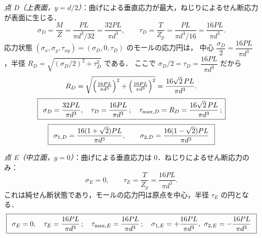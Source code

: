 \documentclass[11pt,a4paper]{article}
\begin{document}
\noindent\textit{点 D（上表面，$y=d/2$）}：曲げによる垂直応力が最大，ねじりによるせん断応力が表面に生じる．
\[
  \sigma_D=\frac{M}{Z}=\frac{PL}{\pi d^3/32}=\frac{32PL}{\pi d^3},\qquad
  \tau_D=\frac{T}{Z_p}=\frac{PL}{\pi d^3/16}=\frac{16PL}{\pi d^3}.
\]
応力状態 $(\sigma_x,\sigma_y,\tau_{xy})=(\sigma_D,0,\tau_D)$ のモールの応力円は，
中心 $\dfrac{\sigma_D}{2}=\dfrac{16PL}{\pi d^3}$，半径 $R_D=\sqrt{(\sigma_D/2)^2+\tau_D^2}$ である．
ここで $\sigma_D/2=\tau_D=\dfrac{16PL}{\pi d^3}$ だから
\[
  R_D=\sqrt{\Bigl(\tfrac{16PL}{\pi d^3}\Bigr)^2+\Bigl(\tfrac{16PL}{\pi d^3}\Bigr)^2}
     =\frac{16\sqrt{2}\,PL}{\pi d^3}.
\]
\[
  \boxed{\,\;\sigma_D=\dfrac{32PL}{\pi d^3},\quad \tau_D=\dfrac{16PL}{\pi d^3}\,;\quad
        \tau_{\max,D}=R_D=\dfrac{16\sqrt2\,PL}{\pi d^3}\,;\,}
\]
\[
  \boxed{\,\;\sigma_{1,D}=\dfrac{16(1+\sqrt2)PL}{\pi d^3},\qquad
        \sigma_{2,D}=\dfrac{16(1-\sqrt2)PL}{\pi d^3}\;\,}
\]

\noindent\textit{点 E（中立面，$y=0$）}：曲げによる垂直応力は $0$．ねじりによるせん断応力のみ：
\[
  \sigma_E=0,\qquad \tau_E=\frac{T}{Z_p}=\frac{16PL}{\pi d^3}.
\]
これは純せん断状態であり，モールの応力円は原点を中心，半径 $\tau_E$ の円となる．
\[
  \ans{\;\sigma_E=0,\quad \tau_E=\dfrac{16PL}{\pi d^3}\,;\quad
        \tau_{\max,E}=\dfrac{16PL}{\pi d^3}\,;\quad
        \sigma_{1,E}=+\dfrac{16PL}{\pi d^3},\ \sigma_{2,E}=-\dfrac{16PL}{\pi d^3}\;}
\]
\end{document}
